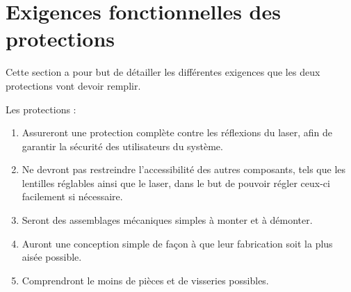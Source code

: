 \section{Exigences fonctionnelles des protections}
Cette section a pour but de détailler les différentes exigences que les deux protections vont devoir remplir.

Les protections :
\begin{enumerate}
    \item Assureront une protection complète contre les réflexions du laser, afin de garantir la sécurité des utilisateurs du système.
    \item Ne devront pas restreindre l'accessibilité des autres composants, tels que les lentilles réglables ainsi que le laser, dans le but de pouvoir régler ceux-ci facilement si nécessaire.
    \item Seront des assemblages mécaniques simples à monter et à démonter.
    \item Auront une conception simple de façon à que leur fabrication soit la plus aisée possible.
    \item Comprendront le moins de pièces et de visseries possibles.
\end{enumerate}
\clearpage

